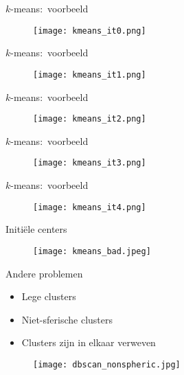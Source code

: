 \documentclass{beamer}
\newcommand{\kmeans}{$k$-means}
\begin{document}
\begin{frame}{\kmeans:\ voorbeeld}
 \begin{figure}[!ht]\centering
  \texttt{[image: kmeans\_it0.png]}
 \end{figure}
\end{frame}

\begin{frame}{\kmeans:\ voorbeeld}
 \begin{figure}[!ht]\centering
  \texttt{[image: kmeans\_it1.png]}
 \end{figure}
\end{frame}

\begin{frame}{\kmeans:\ voorbeeld}
 \begin{figure}[!ht]\centering
  \texttt{[image: kmeans\_it2.png]}
 \end{figure}
\end{frame}

\begin{frame}{\kmeans:\ voorbeeld}
 \begin{figure}[!ht]\centering
  \texttt{[image: kmeans\_it3.png]}
 \end{figure}
\end{frame}

\begin{frame}{\kmeans:\ voorbeeld}
 \begin{figure}[!ht]\centering
  \texttt{[image: kmeans\_it4.png]}
 \end{figure}
\end{frame}

\begin{frame}{Initiële centers}
 \begin{figure}[!ht]\centering
  \texttt{[image: kmeans\_bad.jpeg]}
 \end{figure}
\end{frame}

\begin{frame}{Andere problemen}
 \begin{itemize}
  \item Lege clusters
  \item Niet-sferische clusters
  \item Clusters zijn in elkaar verweven
 \end{itemize}

 \begin{figure}[!ht]\centering
  \texttt{[image: dbscan\_nonspheric.jpg]}
 \end{figure}
\end{frame}
\end{document}

